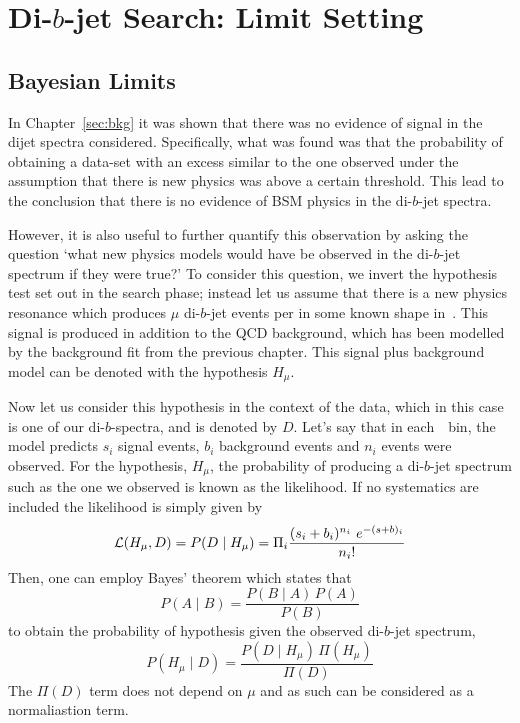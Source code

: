 \chapter{Di-$b$-jet Search: Limit Setting}
\label{sec:lim}

\section{Bayesian Limits}
\label{sec:lim-strat}

In Chapter~\ref{sec:bkg} it was shown that there was no evidence of signal in the dijet spectra considered.
Specifically, what was found was that the probability of obtaining a data-set with an excess similar to the one observed
under the assumption that there is new physics was above a certain threshold.
This lead to the conclusion that there is no evidence of BSM physics in the di-$b$-jet spectra.

However, it is also useful to further quantify this observation by asking the question
`what new physics models would have be observed in the di-$b$-jet spectrum if they were true?'
To consider this question, we invert the hypothesis test set out in the search phase;
instead let us assume that there is a new physics resonance
which produces $\mu$ di-$b$-jet events per \ifb in some known shape in~\mjj.
This signal is produced in addition to the QCD background,
which has been modelled by the background fit from the previous chapter.
This signal plus background model can be denoted with the hypothesis $H_\mu$.

Now let us consider this hypothesis in the context of the data,
which in this case is one of our di-$b$-spectra, and is denoted by $D$.
Let's say that in each~\mjj~bin, the model predicts
$s_i$ signal events, $b_i$ background events and $n_i$ events were observed.
For the hypothesis, $H_\mu$, the probability of producing a di-$b$-jet spectrum
such as the one we observed is known as the likelihood.
If no systematics are included the likelihood is simply given by
\begin{equation}
  \mathcal{L} (H_\mu,D) = P(D \mid H_\mu) =  \Pi_i \frac{(s_i+b_i)^{n_i}~e^{-(s+b)_i}}{n_i!}
\end{equation}
Then, one can employ Bayes' theorem which states that
\begin{equation}
  P(A \mid B) = \frac{P(B \mid A) \, P(A)}{P(B)}
\end{equation}
to obtain the probability of hypothesis given the observed di-$b$-jet spectrum,
\begin{equation}
  P(H_\mu \mid D) = \frac{ P(D \mid H_\mu) \, \Pi( H_\mu ) }{ \Pi( D ) }
\end{equation}
The $\Pi(D)$ term does not depend on $\mu$ and as such can be considered as a normaliastion term.

